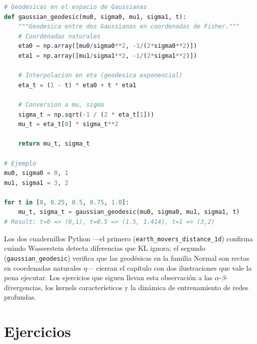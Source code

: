\begin{lstlisting}[language=Python, style=PythonStyle]
# Geodesicas en el espacio de Gaussianas
def gaussian_geodesic(mu0, sigma0, mu1, sigma1, t):
    """Geodesica entre dos Gaussianas en coordenadas de Fisher."""
    # Coordenadas naturales
    eta0 = np.array([mu0/sigma0**2, -1/(2*sigma0**2)])
    eta1 = np.array([mu1/sigma1**2, -1/(2*sigma1**2)])
    
    # Interpolacion en eta (geodesica exponencial)
    eta_t = (1 - t) * eta0 + t * eta1
    
    # Conversion a mu, sigma
    sigma_t = np.sqrt(-1 / (2 * eta_t[1]))
    mu_t = eta_t[0] * sigma_t**2
    
    return mu_t, sigma_t

# Ejemplo
mu0, sigma0 = 0, 1
mu1, sigma1 = 3, 2

for t in [0, 0.25, 0.5, 0.75, 1.0]:
    mu_t, sigma_t = gaussian_geodesic(mu0, sigma0, mu1, sigma1, t)
# Result: t=0 => (0,1), t=0.5 => (1.5, 1.414), t=1 => (3,2)
\end{lstlisting}

\bigskip
\noindent
Los dos cuadernillos Python ---el primero (\texttt{earth\_movers\_distance\_1d}) confirma cuándo Wasserstein detecta diferencias que KL ignora; el segundo (\texttt{gaussian\_geodesic}) verifica que las geodésicas en la familia Normal son rectas en coordenadas naturales $\eta$--- cierran el capítulo con dos ilustraciones que vale la pena ejecutar. Los ejercicios que siguen llevan esta observación a las $\alpha$-$\beta$-divergencias, los kernels característicos y la dinámica de entrenamiento de redes profundas.

\section{Ejercicios}

